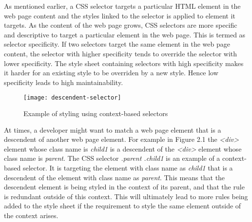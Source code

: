 \documentclass[12pt]{article}
\begin{document}

As mentioned earlier, a CSS selector targets a particular HTML element in the web page content and the styles linked to the selector is applied to element it targets. As the content of the web page grows, CSS selectors are more specific and descriptive to target a particular element in the web page. This is termed as selector specificity. If two selectors target the same element in the web page content, the selector with higher specificity tends to override the selector with lower specificity. The style sheet containing selectors with high specificity makes it harder for an existing style to be overriden by a new style. Hence low specificity leads to high maintainability.

\begin{figure}[h]
\texttt{[image: descendent-selector]}
\centering
\caption{Example of styling using context-based selectors}
\end{figure}

At times, a developer might want to match a web page element that is a descendent of another web page element. For example in Figure 2.1 the \textit{<div>} element whose class name is \textit{child1} is a descendent of the \textit{<div>} element whose class name is \textit{parent}. The CSS selector \textit{.parent .child1} is an example of a context-based selector. It is targeting the element with class name as \textit{child1} that is a descendent of the element with class name as \textit{parent}. This means that the descendent element is being styled in the context of its parent, and that the rule is redundant outside of this context. This will ultimately lead to more rules being added to the style sheet if the requirement to style the same element outside of the context arises.








\end{document}
